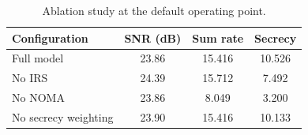 \begin{table}[t]
\caption{Ablation study at the default operating point.}
\label{tab:ablation}
\centering
\begin{tabular}{lccc}
\hline
Configuration & SNR (dB) & Sum rate & Secrecy \\
\hline
Full model & 23.86 & 15.416 & 10.526 \\
No IRS & 24.39 & 15.712 & 7.492 \\
No NOMA & 23.86 & 8.049 & 3.200 \\
No secrecy weighting & 23.90 & 15.416 & 10.133 \\
\hline
\end{tabular}
\end{table}
